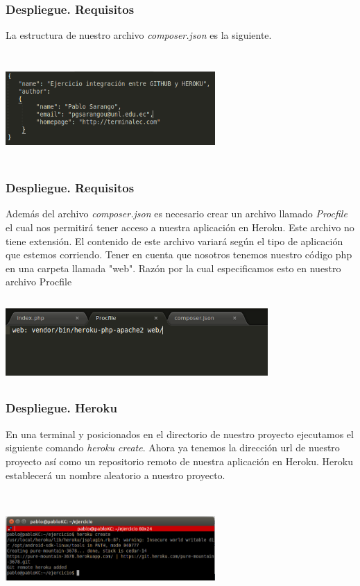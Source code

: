 \documentclass{beamer}
\begin{document}
\begin{frame}
\frametitle{Despliegue. Requisitos}
La estructura de nuestro archivo \textit{composer.json} es la siguiente.\\ \ \\
\centering
\includegraphics[width=8cm, height=4cm]{githubHeroku/26.png}
\end{frame}

\begin{frame}
\frametitle{Despliegue. Requisitos}
Además del archivo \textit{composer.json} es necesario crear un archivo llamado \textit{Procfile} el cual nos permitirá tener acceso a nuestra aplicación en Heroku. Este archivo no tiene extensión. El contenido de este archivo variará según el tipo de aplicación que estemos corriendo. Tener en cuenta que nosotros tenemos nuestro código php en una carpeta llamada "web". Razón por la cual especificamos esto en nuestro archivo Procfile\\ \ \\
\centering
\includegraphics[width=10cm, height=3cm]{githubHeroku/32.png}
\end{frame}

\begin{frame}
\frametitle{Despliegue. Heroku}
En una terminal y posicionados en el directorio de nuestro proyecto ejecutamos el siguiente comando \textit{heroku create}. Ahora ya tenemos la dirección url de nuestro proyecto así como un repositorio remoto de nuestra aplicación en Heroku. Heroku establecerá un nombre aleatorio a nuestro proyecto.\\ \ \\
\centering
\includegraphics[width=8cm, height=4cm]{githubHeroku/14.png}
\end{frame}
\end{document}
